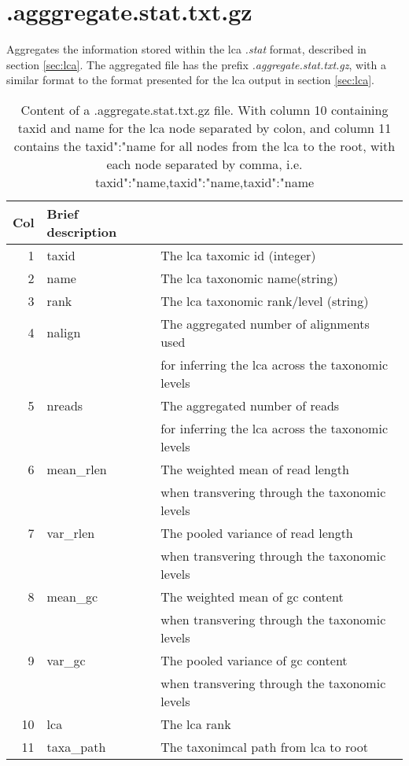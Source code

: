 \documentclass[10pt]{article}
\begin{document}
\section{.agggregate.stat.txt.gz}
Aggregates the information stored within the lca \textit{.stat} format, described in section \ref{sec:lca}. The aggregated file has the prefix \textit{.aggregate.stat.txt.gz}, with a similar format to the format presented for the lca output in section \ref{sec:lca}. 
\begin{table}[h]
\begin{tabular}{rll}
  \hline
  {\bf Col} & {\bf Brief description} \\
  \hline
  1 & {\sf taxid} & The lca taxomic id (integer)\\
  2 & {name} & The lca taxonomic name(string)\\
  3 & {rank} & The lca taxonomic rank/level (string)\\
  4 & {nalign} & The aggregated number of alignments used \\ & & for inferring the lca across the taxonomic levels\\
  5 & {nreads} & The aggregated number of reads \\ & & for inferring the lca across the taxonomic levels\\
  6 & {mean\_rlen} & The weighted mean of read length \\ & & when transvering through the taxonomic levels\\
  7 & {var\_rlen} & The pooled variance of read length \\ & & when transvering through the taxonomic levels\\
  8 & {mean\_gc} & The weighted mean of gc content \\ & & when transvering through the taxonomic levels\\
  9 & {var\_gc} & The pooled variance of gc content \\ & & when transvering through the taxonomic levels\\
  10 & {lca} & The lca rank \\
  11 & {taxa\_path} & The taxonimcal path from lca to root \\ \hline
\end{tabular}\label{aggregate}
\caption{Content of a .aggregate.stat.txt.gz file. With column 10 containing taxid and name for the lca node separated by colon, and column 11 contains the taxid":"name for all nodes from the lca to the root, with each node separated by comma, i.e. taxid":"name,taxid":"name,taxid":"name}
\end{table}
\end{document}
